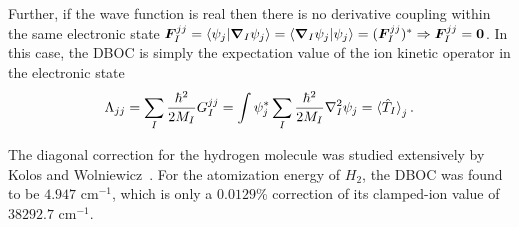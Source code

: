 Further, if the wave function is real then there is no derivative coupling within the same electronic state $\boldsymbol{F}_I^{jj}=\braket{\psi_j|\boldsymbol{\nabla}_I\psi_j} = \braket{\boldsymbol{\nabla}_I\psi_j|\psi_j} = (\boldsymbol{F}_I^{jj})^* \Rightarrow \boldsymbol{F}_I^{jj}=\boldsymbol{0}$. In this case, the DBOC is simply the expectation value of the ion kinetic operator in the electronic state
\begin{align}
\Lambda_{jj} = \sum_I \frac{\hbar^2}{2M_I}G_I^{jj} = \int \psi_j^* \sum_I \frac{\hbar^2}{2M_I} \nabla^2_I\psi_j = \braket{\hat{T}_I}_j.
\end{align}

The diagonal correction for the hydrogen molecule was studied extensively by Kolos and Wolniewicz~\cite{Kolos1964,Kolos1968,Wolniewicz1983}.
For the atomization energy of $H_2$, the DBOC was found to be $4.947$ cm$^{-1}$, which is only a $0.0129$\% correction of its clamped-ion value of $38292.7$ cm$^{-1}$.
